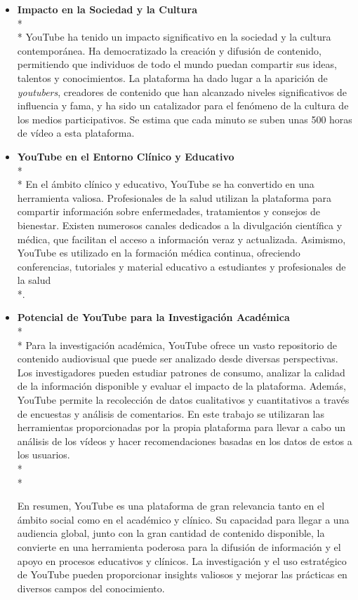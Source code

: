 \documentclass[a4paper,12pt,twoside]{memoir}
\begin{document}
\begin{itemize}
\begin{itemize}
        \item \textbf{Impacto en la Sociedad y la Cultura} \\*\\* YouTube ha tenido un impacto significativo en la sociedad y la cultura contemporánea. Ha democratizado la creación y difusión de contenido, permitiendo que individuos de todo el mundo puedan compartir sus ideas, talentos y conocimientos. La plataforma ha dado lugar a la aparición de \textit{youtubers}, creadores de contenido que han alcanzado niveles significativos de influencia y fama, y ha sido un catalizador para el fenómeno de la cultura de los medios participativos. Se estima que cada minuto se suben unas 500 horas de vídeo a esta plataforma.\cite{statista2024youtube}
        
        \item \textbf{YouTube en el Entorno Clínico y Educativo}\\*\\* En el ámbito clínico y educativo, YouTube se ha convertido en una herramienta valiosa. Profesionales de la salud utilizan la plataforma para compartir información sobre enfermedades, tratamientos y consejos de bienestar. Existen numerosos canales dedicados a la divulgación científica y médica, que facilitan el acceso a información veraz y actualizada. Asimismo, YouTube es utilizado en la formación médica continua, ofreciendo conferencias, tutoriales y material educativo a estudiantes y profesionales de la salud\\*\cite{paulin-2021}.
        \item \textbf{Potencial de YouTube para la Investigación Académica} \\*\\* Para la investigación académica, YouTube ofrece un vasto repositorio de contenido audiovisual que puede ser analizado desde diversas perspectivas. Los investigadores pueden estudiar patrones de consumo, analizar la calidad de la información disponible y evaluar el impacto de la plataforma. Además, YouTube permite la recolección de datos cualitativos y cuantitativos a través de encuestas y análisis de comentarios. En este trabajo se utilizaran las herramientas proporcionadas por la propia plataforma para llevar a cabo un análisis de los vídeos y hacer recomendaciones basadas en los datos de estos a los usuarios.\\*\\*

    \text En resumen, YouTube es una plataforma de gran relevancia tanto en el ámbito social como en el académico y clínico. Su capacidad para llegar a una audiencia global, junto con la gran cantidad de contenido disponible, la convierte en una herramienta poderosa para la difusión de información y el apoyo en procesos educativos y clínicos. La investigación y el uso estratégico de YouTube pueden proporcionar insights valiosos y mejorar las prácticas en diversos campos del conocimiento.
    \end{itemize}


\end{itemize}
\end{document}
